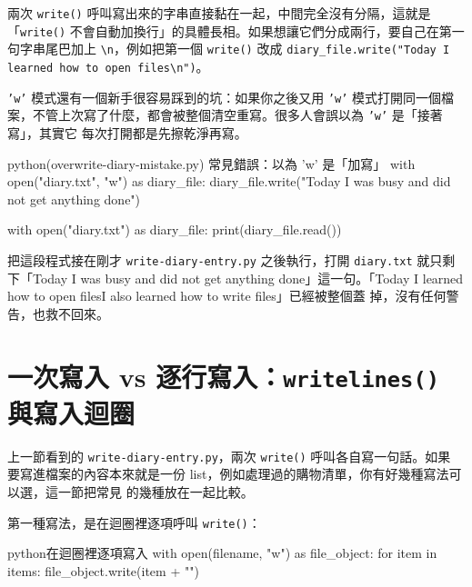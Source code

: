 
兩次 \texttt{write()} 呼叫寫出來的字串直接黏在一起，中間完全沒有分隔，這就是「\texttt{write()}
不會自動加換行」的具體長相。如果想讓它們分成兩行，要自己在第一句字串尾巴加上
\texttt{\textbackslash n}，例如把第一個 \texttt{write()} 改成
\texttt{diary\_file.write("Today I learned how to open files\textbackslash n")}。

\texttt{'w'} 模式還有一個新手很容易踩到的坑：如果你之後又用 \texttt{'w'} 模式打開同一個檔
案，不管上次寫了什麼，都會被整個清空重寫。很多人會誤以為 \texttt{'w'} 是「接著寫」，其實它
每次打開都是先擦乾淨再寫。

\begin{example}{python}{(overwrite-diary-mistake.py) 常見錯誤：以為 'w' 是「加寫」}
with open("diary.txt", "w") as diary_file:
    diary_file.write("Today I was busy and did not get anything done")

with open("diary.txt") as diary_file:
    print(diary_file.read())
\end{example}


把這段程式接在剛才 \texttt{write-diary-entry.py} 之後執行，打開 \texttt{diary.txt} 就只剩
下「Today I was busy and did not get anything done」這一句。「Today I learned how to
open filesI also learned how to write files」已經被整個蓋
掉，沒有任何警告，也救不回來。


\section{一次寫入 vs 逐行寫入：\texttt{writelines()} 與寫入迴圈}
\label{sec:writing-styles}

上一節看到的 \texttt{write-diary-entry.py}，兩次 \texttt{write()} 呼叫各自寫一句話。如果
要寫進檔案的內容本來就是一份 list，例如處理過的購物清單，你有好幾種寫法可以選，這一節把常見
的幾種放在一起比較。

第一種寫法，是在迴圈裡逐項呼叫 \texttt{write()}：

\begin{code}{python}{在迴圈裡逐項寫入}
with open(filename, "w") as file_object:
    for item in items:
        file_object.write(item + "\n")
\end{code}

